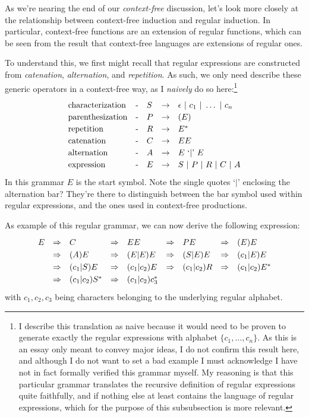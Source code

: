 \documentclass[twoside]{article}
\newcommand{\RA}{\Rightarrow}
\begin{document}
As we're nearing the end of our \emph{context-free} discussion, let's look more closely at the relationship
between context-free induction and regular induction. In particular, context-free functions are an extension
of regular functions, which can be seen from the result that context-free languages are extensions of regular ones.

To understand this, we first might recall that regular expressions are constructed from \emph{catenation},
\emph{alternation}, and \emph{repetition}. As such, we only need describe these generic operators in a context-free
way, as I \emph{naively} do so here:\footnote{I describe this translation as naive because it would need to be proven
to generate exactly the regular expressions with alphabet $ \{c_1, \ldots, c_n\} $. As this is an essay only meant
to convey major ideas, I do not confirm this result here, and although I do not want to set a bad example I must
acknowledge I have not in fact formally verified this grammar myself. My reasoning is that this particular grammar
translates the recursive definition of regular expressions quite faithfully, and if nothing else at least contains
the language of regular expressions, which for the purpose of this subsubsection is more relevant.}
$$ \def\arraystretch{1.2}
\begin{array}{lclcl}
\mbox{characterization}		& \mbox{-} & S & \to & \epsilon\ |\ c_1\ |\ \ldots\ |\ c_n		\\
\mbox{parenthesization}		& \mbox{-} & P & \to & (E)						\\
\mbox{repetition}		& \mbox{-} & R & \to & E^*						\\
\mbox{catenation}		& \mbox{-} & C & \to & EE						\\
\mbox{alternation}		& \mbox{-} & A & \to & E\ \mbox{`$|$'}\ E				\\
\mbox{expression}		& \mbox{-} & E & \to & S\ |\ P\ |\ R\ |\ C\ |\ A
\end{array} $$
In this grammar $ E $ is the start symbol. Note the single quotes `$|$' enclosing the alternation bar? They're there
to distinguish between the bar symbol used within regular expressions, and the ones used in context-free productions.

As example of this regular grammar, we can now derive the following expression:
$$ \def\arraystretch{1.25}
\begin{array}{rclllllll}
E	& \RA & C		& \RA & EE		& \RA & PE		& \RA & (E)E			\\
	& \RA & (A)E		& \RA & (E|E)E		& \RA & (S|E)E		& \RA & (c_1|E)E		\\
	& \RA & (c_1|S)E	& \RA & (c_1|c_2)E	& \RA & (c_1|c_2)R	& \RA & (c_1|c_2)E^*		\\
	& \RA & (c_1|c_2)S^*	& \RA & (c_1|c_2)c_3^*
\end{array} $$
with $ c_1, c_2, c_3 $ being characters belonging to the underlying regular alphabet.
\end{document}
